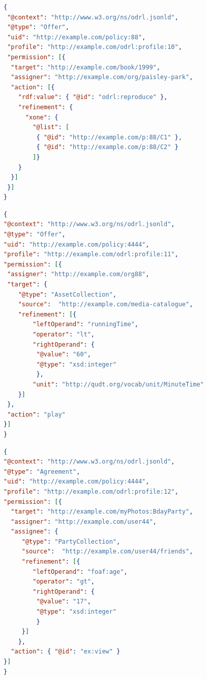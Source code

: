 \documentclass[12pt,a4paper,twoside]{book}
\begin{document}
\begin{lstlisting}[language=json,firstnumber=1,caption={Constraint logico su azione: l'azione \textbf{reproduce} è permessa solo nella forma di uno dei due constraint listati},captionpos=b,label=esempioLogRef]
{
 "@context": "http://www.w3.org/ns/odrl.jsonld",
 "@type": "Offer",
 "uid": "http://example.com/policy:88",
 "profile": "http://example.com/odrl:profile:10",
 "permission": [{
  "target": "http://example.com/book/1999",
  "assigner": "http://example.com/org/paisley-park",
  "action": [{
    "rdf:value": { "@id": "odrl:reproduce" },
	"refinement": {
	  "xone": { 
	    "@list": [ 
		 { "@id": "http://example.com/p:88/C1" },
		 { "@id": "http://example.com/p:88/C2" } 
		]}
	}
  }]
 }]
}
\end{lstlisting}
\begin{lstlisting}[language=json,firstnumber=1,caption={Constraint su asset: l'azione \textbf{play} è permessa solo sui target di durata strettamente inferiore a 60 minuti},captionpos=b,label=esempioConAss]
{
"@context": "http://www.w3.org/ns/odrl.jsonld",
"@type": "Offer",
"uid": "http://example.com/policy:4444",
"profile": "http://example.com/odrl:profile:11",
"permission": [{
 "assigner": "http://example.com/org88",
 "target": {
 	"@type": "AssetCollection",
 	"source":  "http://example.com/media-catalogue",
 	"refinement": [{
 		"leftOperand": "runningTime",
 		"operator": "lt",
 		"rightOperand": { 
 		 "@value": "60",
 		 "@type": "xsd:integer"
 		 },
 		"unit": "http://qudt.org/vocab/unit/MinuteTime"
 	}]
 },
 "action": "play"
}]
}
\end{lstlisting}
\begin{lstlisting}[language=json,firstnumber=1,caption={Constraint su party: l'azione \textbf{view} è permessa solo alle entità con età strettamente superiore a 17 anni},captionpos=b,label=esempioConParty]
{
"@context": "http://www.w3.org/ns/odrl.jsonld",
"@type": "Agreement",
"uid": "http://example.com/policy:4444",
"profile": "http://example.com/odrl:profile:12",
"permission": [{
  "target": "http://example.com/myPhotos:BdayParty",
  "assigner": "http://example.com/user44",
  "assignee": {
     "@type": "PartyCollection",
 	 "source":  "http://example.com/user44/friends",
 	 "refinement": [{
 	 	"leftOperand": "foaf:age",
 	 	"operator": "gt",
 	 	"rightOperand": { 
 	 	 "@value": "17",
 	 	 "@type": "xsd:integer"
 		 }
 	 }]
 	},
  "action": { "@id": "ex:view" }
}]
}
\end{lstlisting}
\end{document}
